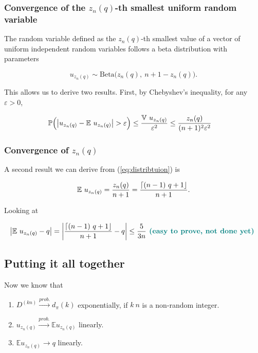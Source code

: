 \documentclass[american, abstract=on]{scrartcl}
\newcommand{\E}{\mathbb{E}}
\newcommand{\V}{\mathbb{V}}
\renewcommand{\P}{\mathbb{P}}
\DeclarePairedDelimiter\round{\lceil}{\rfloor}
\newcommand\notes[1]{\textcolor{teal}{\textbf{#1}}}
\DeclarePairedDelimiter\abs{\lvert}{\rvert}%
\begin{document}
\subsubsection[Smallest uniform]{Convergence of the $z_n(q)$-th smallest uniform random variable}

The random variable defined as the $z_n(q)$-th smallest value of a vector of uniform independent random variables follows a beta distribution with parameters

\begin{equation} \label{eq:distribtuion}
  u_{z_n(q)} \sim \text{Beta}\Big(z_n(q), \  n + 1 - z_n(q)\Big).
\end{equation}

This allows us to derive two results. First, by Chebyshev's inequality, for any $\varepsilon > 0$,

\begin{equation}
  \begin{split}
    \P\Big( \abs*{u_{z_n(q)} - \E \ u_{z_n(q)}} > \varepsilon \Big) &\leq \frac{\V \ u_{z_n(q)}}{\varepsilon^2} \leq \frac{z_n(q)}{(n+1)^2  \varepsilon^2}
  \end{split}
\end{equation}

\subsubsection[Error of indexing]{Convergence of $z_n(q)$}

A second result we can derive from (\ref{eq:distribtuion}) is 

\begin{equation}
  \E \ u_{z_n(q)} = \frac{z_n(q)}{n + 1} = \frac{\round*{(n-1) \ q + 1}}{n+1}.
\end{equation}

Looking at 

\begin{equation}
  \abs*{\E \ u_{z_n(q)} - q} = \abs*{\frac{\round*{(n-1) \ q + 1}}{n+1} - q} \leq \frac{5}{3n} \notes{ (easy to prove, not done yet) }
\end{equation}

\subsection{Putting it all together}

Now we know that

\begin{enumerate}
  \item $D^{(kn)} \xrightarrow{prob.} d_{\pi}(k)$ exponentially, if $k \ n$ is a non-random integer.
  \item $u_{z_n(q)} \xrightarrow{prob.} \E u_{z_n(q)}$ linearly.
  \item $\E u_{z_n(q)} \rightarrow q$ linearly.
\end{enumerate}
\end{document}
